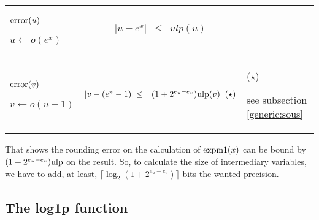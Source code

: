 \documentclass[12pt]{amsart}
\def\n{\textnormal}
\def\ulp{{\rm ulp}}
\begin{document}
\begin{center}
\begin{tabular}{l l l}

\begin{minipage}{2.5cm}


${\textnormal{error}}(u)$


$u \leftarrow o(e^x)$

\end{minipage} &
\begin{minipage}{7.5cm}

\begin{eqnarray}\nonumber
  |u-e^x| &\leq& ulp(u)\\\nonumber
\end{eqnarray}

\end{minipage} &
\begin{minipage}{6cm}
{\hspace{7cm}}
\end{minipage}\\%
\begin{minipage}{2.5cm}
${\textnormal{error}}(v)$


$v \leftarrow o(u-1) $

\end{minipage} &
\begin{minipage}{7.5cm}

\begin{eqnarray}\nonumber
  |v-(e^x-1)| &\leq& (1+2^{e_u-e_v})\ulp(v)\;\;(\star)
\end{eqnarray}


\end{minipage} &
\begin{minipage}{6cm}
($\star$)

see subsection \ref{generic:sous}


\end{minipage}
\end{tabular}
\end{center}



That shows the rounding error on the calculation of $\n{expm1}(x)$ can be
bound by $(1+2^{e_u-e_v}) \ulp$ on the result. So, to calculate the size of
intermediary variables, we have to add, at least, $\lceil \log_2 (1+2^{e_u-e_v})\rceil$ bits the wanted precision.

\subsection{The log1p function}
\end{document}
